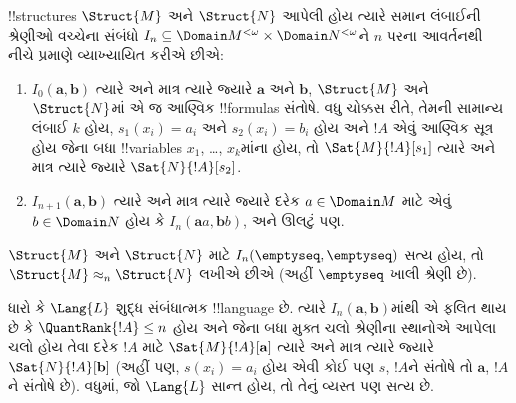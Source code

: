 \documentclass[../../../include/open-logic-section]{subfiles}
\begin{document}
\begin{defn}
  !!{structure}s $\Struct{M}$ અને $\Struct{N}$ આપેલી હોય ત્યારે સમાન
  લંબાઈની શ્રેણીઓ વચ્ચેના સંબંધો $I_n \subseteq \Domain M^{<\omega}
  \times \Domain N^{<\omega}$ને $n$ પરના આવર્તનથી નીચે પ્રમાણે
  વ્યાખ્યાયિત કરીએ છીએ:
   \begin{enumerate}
   \item $I_0(\mathbf{a},\mathbf{b})$ ત્યારે અને માત્ર ત્યારે જ્યારે
     $\mathbf{a}$ અને $\mathbf{b}$, $\Struct{M}$ અને $\Struct{N}$માં
     એ જ આણ્વિક !!{formula}s સંતોષે. વધુ ચોક્કસ રીતે, તેમની સામાન્ય
     લંબાઈ $k$ હોય, $s_1(x_i) = a_i$ અને $s_2(x_i) = b_i$ હોય અને
     $!A$ એવું આણ્વિક સૂત્ર હોય જેના બધા !!{variable}s $x_1$, \dots,
     $x_k$માંના હોય, તો $\Sat{M}{!A}[s_1]$ ત્યારે અને માત્ર ત્યારે જ્યારે
     $\Sat{N}{!A}[s_2]$.
   \item $I_{n+1} (\mathbf{a},\mathbf{b})$ ત્યારે અને માત્ર ત્યારે
     જ્યારે દરેક $a\in \Domain M$ માટે એવું $b\in \Domain N$ હોય કે
     $I_n(\mathbf{a}a,\mathbf{b}b)$, અને ઊલટું પણ.
   \end{enumerate}
\end{defn}


\begin{defn}
  $\Struct{M}$ અને $\Struct{N}$ માટે
  $I_n(\emptyseq,\emptyseq)$ સત્ય હોય, તો $\Struct{M} \approx_n
  \Struct{N}$ લખીએ છીએ (અહીં $\emptyseq$ ખાલી શ્રેણી છે).
\end{defn}

\begin{thm}
  ધારો કે $\Lang{L}$ શુદ્ધ સંબંધાત્મક !!{language} છે. ત્યારે
  $I_n(\mathbf{a},\mathbf{b})$માંથી એ ફલિત થાય છે કે
  $\QuantRank{!A} \le n$ હોય અને જેના બધા મુક્ત ચલો શ્રેણીના સ્થાનોએ
  આપેલા ચલો હોય તેવા દરેક $!A$ માટે
  $\Sat{M}{!A}[\mathbf{a}]$ ત્યારે અને માત્ર ત્યારે જ્યારે
  $\Sat{N}{!A}[\mathbf{b}]$ (અહીં પણ, $s(x_i) = a_i$ હોય એવી કોઈ પણ
  $s$, $!A$ને સંતોષે તો $\mathbf{a}$, $!A$ને સંતોષે છે). વધુમાં, જો
  $\Lang{L}$ સાન્ત હોય, તો તેનું વ્યસ્ત પણ સત્ય છે.
\end{thm}
\end{document}
